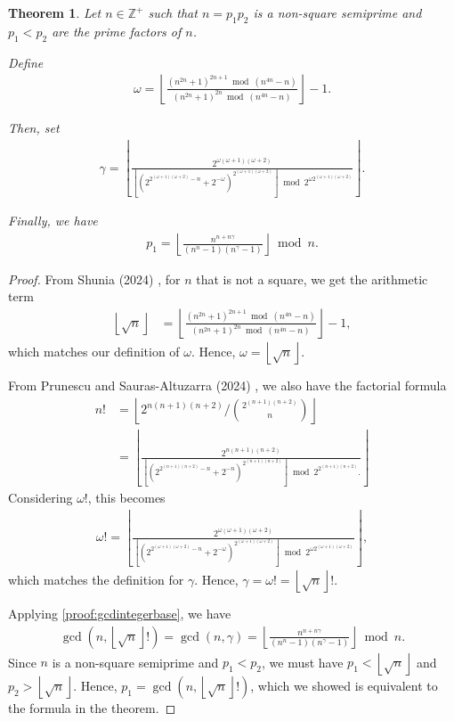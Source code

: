 \documentclass[11pt,reqno]{article}
\theoremstyle{plain}
\newtheorem{theorem}{Theorem}
\theoremstyle{definition}
\newcommand{\floor}[1]{\left\lfloor #1 \right\rfloor}
\begin{document}
\begin{theorem} \label{proof:semiprimefactorp1}
Let $n \in \mathbb{Z}^+$ such that $n = p_1 p_2$ is a non-square semiprime and $p_1 < p_2$ are the prime factors of $n$.

Define
\begin{align*}
\omega = \floor{\frac{(n^{2n} + 1)^{2n+1} \bmod (n^{4n}-n)}{(n^{2n} + 1)^{2n} \bmod (n^{4n}-n)}} - 1 .
\end{align*}

Then, set
\begin{align*}
\gamma = \floor
{
    \frac{2^{\omega (\omega+1)(\omega+2)}}
    {
        \floor
        {
        (2^{2^{(\omega+1)(\omega+2)} - n} + 2^{-\omega})^{ 2^{(\omega+1)(\omega+2)} }
        }
        \bmod 2^{\omega 2^{(\omega+1)(\omega+2)} }
    }
} .
\end{align*}

Finally, we have
\begin{align*}
p_1 = \floor{\frac{n^{n+n\gamma}}{(n^n-1)(n^{\gamma}-1)}}\bmod n .
\end{align*}
\end{theorem}
\begin{proof}
From Shunia (2024) \cite{shunia2024polynomial}, for $n$ that is not a square, we get the arithmetic term
\begin{align*}
\floor{\sqrt{n}} &=
\floor{\frac{(n^{2n} + 1)^{2n+1} \bmod (n^{4n}-n)}{(n^{2n} + 1)^{2n} \bmod (n^{4n}-n)}} - 1 ,
\end{align*}
which matches our definition of $\omega$. Hence, $\omega = \floor{\sqrt{n}}$.

From Prunescu and Sauras-Altuzarra (2024) \cite{prunescu2024factorial}, we also have the factorial formula
\begin{align*}
n! &= \floor{2^{n(n+1)(n+2)} / \binom{2^{(n+1)(n+2)}}{n}} \\
&= \floor
{
    \frac
    {
        2^{n(n+1)(n+2)}
    }
    {
        \floor
        {
            \left(
                2^{2^{(n+1)(n+2)}-n} + 2^{-n}
            \right)^{2^{(n+1)(n+2)}}
        }
        \bmod
        2^{2^{(n+1)(n+2)}} .
    }
}
\end{align*}
Considering $\omega!$, this becomes
\begin{align*}
\omega! = \floor
{
    \frac{2^{\omega (\omega+1)(\omega+2)}}
    {
        \floor
        {
        (2^{2^{(\omega+1)(\omega+2)} - n} + 2^{-\omega})^{ 2^{(\omega+1)(\omega+2)} }
        }
        \bmod 2^{\omega 2^{(\omega+1)(\omega+2)} }
    }
} ,
\end{align*}
which matches the definition for $\gamma$. Hence, $\gamma = \omega! = \floor{\sqrt{n}}!$.

Applying \cref{proof:gcdintegerbase}, we have
\begin{align*}
    \gcd(n, \floor{\sqrt{n}}!) = \gcd(n,\gamma) = \floor{\frac{n^{n+n\gamma}}{(n^n-1)(n^{\gamma}-1)}}\bmod n .
\end{align*}
Since $n$ is a non-square semiprime and $p_1 < p_2$, we must have $p_1 < \floor{\sqrt{n}}$ and $p_2 > \floor{\sqrt{n}}$. Hence, $p_1 = \gcd(n,\floor{\sqrt{n}}!)$, which we showed is equivalent to the formula in the theorem.
\end{proof}
\end{document}
